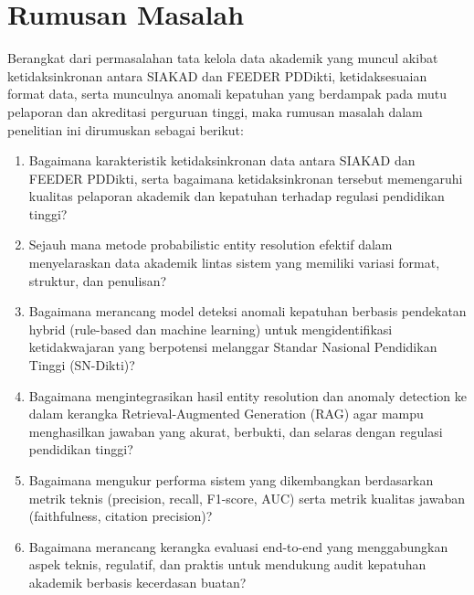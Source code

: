 \documentclass[12pt,a4paper,oneside]{report}
\begin{document}

        \section{Rumusan Masalah}
            Berangkat dari permasalahan tata kelola data akademik yang muncul akibat ketidaksinkronan antara SIAKAD dan FEEDER PDDikti, ketidaksesuaian format data, serta munculnya anomali kepatuhan yang berdampak pada mutu pelaporan dan akreditasi perguruan tinggi,
            maka rumusan masalah dalam penelitian ini dirumuskan sebagai berikut:
            \begin{enumerate}
                \item Bagaimana karakteristik ketidaksinkronan data antara SIAKAD dan FEEDER PDDikti, serta bagaimana ketidaksinkronan tersebut memengaruhi kualitas pelaporan akademik dan kepatuhan terhadap regulasi pendidikan tinggi?
                \item Sejauh mana metode probabilistic entity resolution efektif dalam menyelaraskan data akademik lintas sistem yang memiliki variasi format, struktur, dan penulisan?
                \item Bagaimana merancang model deteksi anomali kepatuhan berbasis pendekatan hybrid (rule-based dan machine learning) untuk mengidentifikasi ketidakwajaran yang berpotensi melanggar Standar Nasional Pendidikan Tinggi (SN-Dikti)?
                \item Bagaimana mengintegrasikan hasil entity resolution dan anomaly detection ke dalam kerangka Retrieval-Augmented Generation (RAG) agar mampu menghasilkan jawaban yang akurat, berbukti, dan selaras dengan regulasi pendidikan tinggi?
                \item Bagaimana mengukur performa sistem yang dikembangkan berdasarkan metrik teknis (precision, recall, F1-score, AUC) serta metrik kualitas jawaban (faithfulness, citation precision)?
                \item Bagaimana merancang kerangka evaluasi end-to-end yang menggabungkan aspek teknis, regulatif, dan praktis untuk mendukung audit kepatuhan akademik berbasis kecerdasan buatan?
            \end{enumerate}
            
\end{document}
